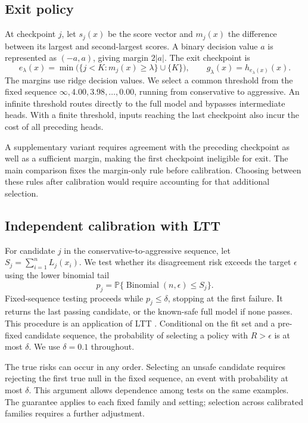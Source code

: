 \documentclass[pdflatex,sn-basic,Numbered]{sn-jnl}
\newcommand{\Prob}{\mathbb{P}}
\begin{document}
\subsection{Exit policy}
At checkpoint $j$, let $s_j(x)$ be the score vector and $m_j(x)$ the difference between its largest and second-largest scores. A binary decision value $a$ is represented as $(-a,a)$, giving margin $2|a|$. The exit checkpoint is
\begin{equation}
 e_\lambda(x)=\min\bigl(\{j<K:m_j(x)\ge\lambda\}\cup\{K\}\bigr),
 \qquad g_\lambda(x)=h_{e_\lambda(x)}(x).\label{eq:exit}
\end{equation}
The margins use ridge decision values. We select a common threshold from the fixed sequence $\infty,4.00,3.98,\ldots,0.00$, running from conservative to aggressive. An infinite threshold routes directly to the full model and bypasses intermediate heads. With a finite threshold, inputs reaching the last checkpoint also incur the cost of all preceding heads.

A supplementary variant requires agreement with the preceding checkpoint as well as a sufficient margin, making the first checkpoint ineligible for exit. The main comparison fixes the margin-only rule before calibration. Choosing between these rules after calibration would require accounting for that additional selection.

\subsection{Independent calibration with LTT}
For candidate $j$ in the conservative-to-aggressive sequence, let $S_j=\sum_{i=1}^{n} L_j(x_i)$. We test whether its disagreement risk exceeds the target $\epsilon$ using the lower binomial tail
\begin{equation}
 p_j=\Prob\{\operatorname{Binomial}(n,\epsilon)\le S_j\}.
\end{equation}
Fixed-sequence testing proceeds while $p_j\le\delta$, stopping at the first failure. It returns the last passing candidate, or the known-safe full model if none passes. This procedure is an application of LTT \cite{ltt}. Conditional on the fit set and a pre-fixed candidate sequence, the probability of selecting a policy with $R>\epsilon$ is at most $\delta$. We use $\delta=0.1$ throughout.

The true risks can occur in any order. Selecting an unsafe candidate requires rejecting the first true null in the fixed sequence, an event with probability at most $\delta$. This argument allows dependence among tests on the same examples. The guarantee applies to each fixed family and setting; selection across calibrated families requires a further adjustment.
\end{document}
